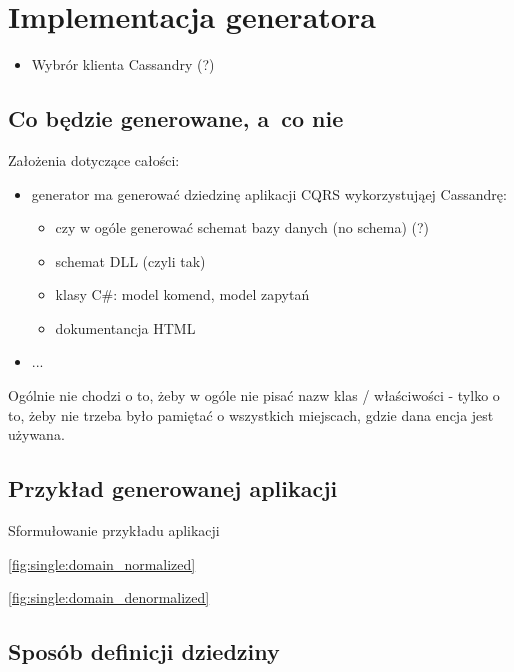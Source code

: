 \chapter{Implementacja generatora} \label{chap:implementation:single_type}

\begin{itemize}
 \item Wybrór klienta Cassandry (?)  
\end{itemize}



\section{Co będzie generowane, a~co nie}

Założenia dotyczące całości:

\begin{itemize}
 \item generator ma generować dziedzinę aplikacji CQRS wykorzystująej Cassandrę:
  \begin{itemize}
   \item czy w ogóle generować schemat bazy danych (no schema) (?)
   \item schemat DLL (czyli tak)
   \item klasy C\#: model komend, model zapytań
   \item dokumentancja HTML
  \end{itemize}
 \item ...
\end{itemize}

Ogólnie nie chodzi o to, żeby w ogóle nie pisać nazw klas / właściwości - tylko o to, żeby nie trzeba było pamiętać o wszystkich miejscach, gdzie dana encja jest używana.



\section{Przykład generowanej aplikacji}

Sformułowanie przykładu aplikacji

\ref{fig:single:domain_normalized}


\ref{fig:single:domain_denormalized}



\section{Sposób definicji dziedziny}

